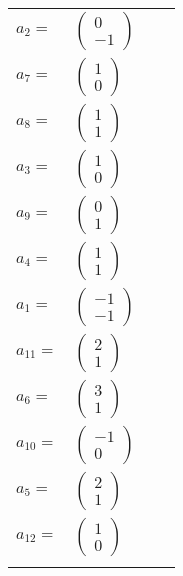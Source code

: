 \documentclass[1p]{elsarticle_modified}
\theoremstyle{definition}
\begin{document}
\begin{tabular}{m{7pt} m{180pt} m{7pt} m{180pt} }
\flushright $a_{2}=$&$\begin{pmatrix}0\\-1\end{pmatrix}$ \\
\flushright $a_{7}=$&$\begin{pmatrix}1\\0\end{pmatrix}$ \\
\flushright $a_{8}=$&$\begin{pmatrix}1\\1\end{pmatrix}$ \\
\flushright $a_{3}=$&$\begin{pmatrix}1\\0\end{pmatrix}$ \\
\flushright $a_{9}=$&$\begin{pmatrix}0\\1\end{pmatrix}$ \\
\flushright $a_{4}=$&$\begin{pmatrix}1\\1\end{pmatrix}$ \\
\flushright $a_{1}=$&$\begin{pmatrix}-1\\-1\end{pmatrix}$ \\
\flushright $a_{11}=$&$\begin{pmatrix}2\\1\end{pmatrix}$ \\
\flushright $a_{6}=$&$\begin{pmatrix}3\\1\end{pmatrix}$ \\
\flushright $a_{10}=$&$\begin{pmatrix}-1\\0\end{pmatrix}$ \\
\flushright $a_{5}=$&$\begin{pmatrix}2\\1\end{pmatrix}$ \\
\flushright $a_{12}=$&$\begin{pmatrix}1\\0\end{pmatrix}$\\&\end{tabular}
\end{document}
